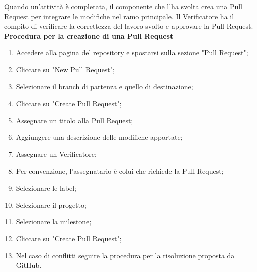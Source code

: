 Quando un'attività è completata, il componente che l'ha svolta crea una Pull Request per integrare le modifiche
nel ramo principale. Il Verificatore ha il compito di verificare la correttezza del lavoro svolto e approvare la Pull Request.
\textbf{Procedura per la creazione di una Pull Request} \label{pull_request}
\begin{enumerate}
	\item Accedere alla pagina del repository e spostarsi sulla sezione "Pull Request";
	\item Cliccare su "New Pull Request";
	\item Selezionare il branch di partenza e quello di destinazione;
	\item Cliccare su "Create Pull Request";
	\item Assegnare un titolo alla Pull Request;
	\item Aggiungere una descrizione delle modifiche apportate;
	\item Assegnare un Verificatore;
	\item Per convenzione, l'assegnatario è colui che richiede la Pull Request;
	\item Selezionare le label;
	\item Selezionare il progetto;
	\item Selezionare la milestone;
	\item Cliccare su "Create Pull Request";
	\item Nel caso di conflitti seguire la procedura per la risoluzione proposta da GitHub.
\end{enumerate}

